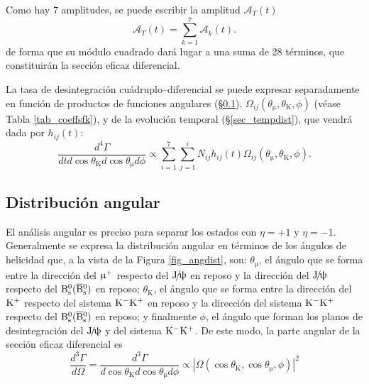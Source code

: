 Como hay $7$ amplitudes, se puede escribir la amplitud $\mathcal{A}_T(t)$
\begin{equation}
\mathcal{A}_T(t) = \sum_{k=1}^{7} \mathcal{A}_k (t).	
\end{equation}
de forma que su módulo cuadrado dará lugar a una suma de 28 términos, que constituirán la sección eficaz diferencial. 

La tasa de desintegración cuádruplo--diferencial se puede expresar separadamente en función de productos de funciones angulares (\S \ref{sec_angdist}), $\Omega_{ij}(\theta_{\upmu},\theta_{\text{K}},\phi)$ (véase Tabla \ref{tab_coeffsfk}), y de la evolución temporal (\S \ref{sec_tempdist}), que vendrá dada por $h_{ij}(t)$:
%
\begin{equation}
\frac{d^4 \Gamma}{dt d\cos\theta_{\text{K}} d\cos\theta_{\upmu} d\phi} \propto \sum_{i=1}^{7}  \sum_{j=1}^i N_{ij} h_{ij}(t) \Omega_{ij}(\theta_{\upmu},\theta_{\text{K}},\phi).
\end{equation}


\subsection{Distribución angular} %
\label{sec_angdist}

El análisis angular es preciso para separar los estados con $\eta = +1$ y $\eta = -1$.
Generalmente se expresa la distribución angular en términos de los ángulos de helicidad que, a la vista de la Figura \ref{fig_angdist}, son: $\theta_{\upmu}$, el ángulo que se forma entre la dirección del $\upmu{}^{+}$ respecto del $\mathrm{J}\!/\!\uppsi$ en reposo y la dirección del $\mathrm{J}\!/\!\uppsi$ respecto del $\mathrm{B}{}_{\mathrm{s}}^{0}(\overline{\mathrm{B}}{}_{\mathrm{s}}^{0})$ en reposo; $\theta_{\text{K}}$, el ángulo que se forma entre la dirección del $\mathrm{K}{}^{+}$ respecto del sistema $\mathrm{K}{}^{-} \mathrm{K}{}^{+}$ en reposo y la dirección del sistema $\mathrm{K}{}^{-} \mathrm{K}{}^{+}$ respecto del $\mathrm{B}{}_{\mathrm{s}}^{0}(\overline{\mathrm{B}}{}_{\mathrm{s}}^{0})$ en reposo; y finalmente $\phi$, el ángulo que forman los planos de desintegración del $\mathrm{J}\!/\!\uppsi$ y del sistema $\mathrm{K}{}^{-} \mathrm{K}{}^{+}$.
%
De este modo, la parte angular de la sección eficaz diferencial es
\begin{equation}
\frac{d^3 \Gamma}{d \Omega} = \frac{d^3 \Gamma}{d \cos\theta_{\text{K}} d\cos\theta_{\upmu} d\phi}	\propto |\Omega(\cos\theta_{\text{K}} ,\cos\theta_{\upmu} ,\phi) |^2
\end{equation}


